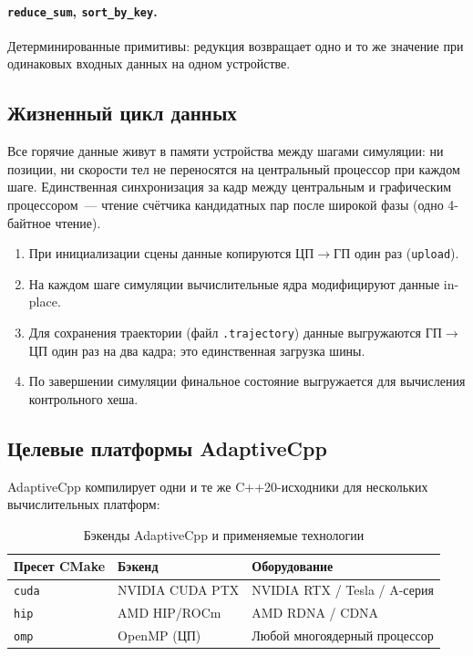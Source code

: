 \paragraph{\texttt{reduce\_sum}, \texttt{sort\_by\_key}.}
Детерминированные примитивы: редукция возвращает одно и то же значение
при одинаковых входных данных на одном устройстве.

\subsection{Жизненный цикл данных}

Все горячие данные живут в памяти устройства между шагами симуляции: ни позиции, ни скорости тел не 
переносятся на центральный процессор при каждом шаге. Единственная синхронизация за кадр между центральным и графическим процессором~--- чтение счётчика 
кандидатных пар после широкой фазы (одно 4-байтное чтение).

\begin{enumerate}
  \item При инициализации сцены данные копируются ЦП$\to$ГП один раз (\texttt{upload}).
  \item На каждом шаге симуляции вычислительные ядра модифицируют данные in-place.
  \item Для сохранения траектории (файл \texttt{.trajectory}) данные
    выгружаются ГП$\to$ЦП один раз на два кадра; это единственная загрузка шины.
  \item По завершении симуляции финальное состояние выгружается для
    вычисления контрольного хеша.
\end{enumerate}

\subsection{Целевые платформы AdaptiveCpp}

AdaptiveCpp компилирует одни и те же C++20-исходники для нескольких вычислительных платформ:

\begin{table}[h]
\centering
\caption{Бэкенды AdaptiveCpp и применяемые технологии}
\label{tab:backends}
\begin{tabular}{lll}
\toprule
\textbf{Пресет CMake} & \textbf{Бэкенд} & \textbf{Оборудование} \\
\midrule
\texttt{cuda}    & NVIDIA CUDA PTX  & NVIDIA RTX / Tesla / A-серия \\
\texttt{hip}     & AMD HIP/ROCm     & AMD RDNA / CDNA \\
\texttt{omp}     & OpenMP (ЦП)      & Любой многоядерный процессор \\
\bottomrule
\end{tabular}
\end{table}

